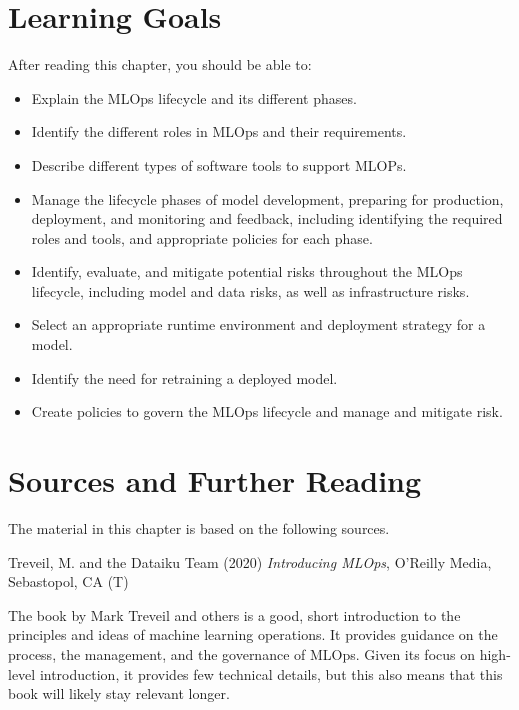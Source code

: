 %
%
\section*{Learning Goals}

After reading this chapter, you should be able to:
\begin{itemize}
    \item Explain the MLOps lifecycle and its different phases. 
    \item Identify the different roles in MLOps and their requirements.
    \item Describe different types of software tools to support MLOPs.
    \item Manage the lifecycle phases of model development, preparing for production, deployment, and monitoring and feedback, including identifying the required roles and tools, and appropriate policies for each phase.
    \item Identify, evaluate, and mitigate potential risks throughout the MLOps lifecycle, including model and data risks, as well as infrastructure risks.
    \item Select an appropriate runtime environment and deployment strategy for a model.
    \item Identify the need for retraining a deployed model.
    \item Create policies to govern the MLOps lifecycle and manage and mitigate risk.
\end{itemize}

\section*{Sources and Further Reading}

The material in this chapter is based on the following sources. 

\begin{resourcebox}
Treveil, M. and the Dataiku Team (2020) \emph{Introducing MLOps}, O'Reilly Media, Sebastopol, CA (T) 
\end{resourcebox}

The book by Mark Treveil and others is a good, short introduction to the principles and ideas of machine learning operations. It provides guidance on the process, the management, and the governance of MLOps. Given its focus on high-level introduction, it provides few technical details, but this also means that this book will likely stay relevant longer. 


